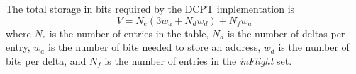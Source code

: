 The total storage in bits required by the DCPT implementation is
\begin{equation*}
V = N_e (3 w_a + N_d w_d) + N_f w_a
\end{equation*}
where $N_e$ is the number of entries in the table, $N_d$ is the number of deltas
per entry, $w_a$ is the number of bits needed to store an address, $w_d$ is the
number of bits per delta, and $N_f$ is the number of entries in the
\emph{inFlight} set.
